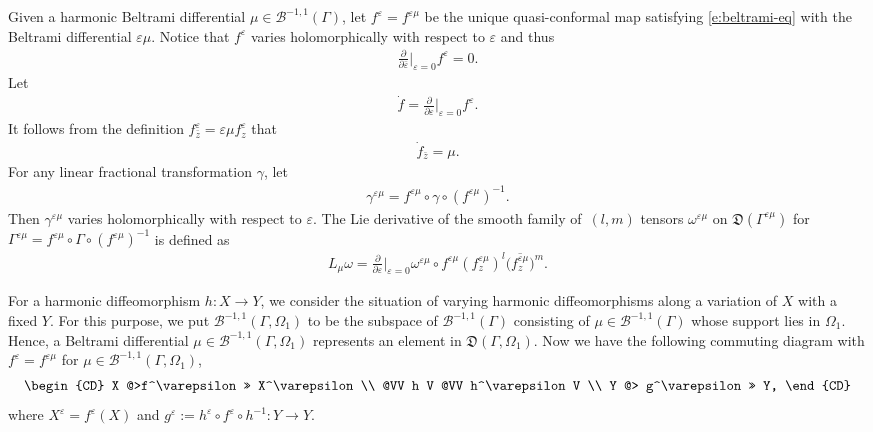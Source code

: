 \documentclass[pdftex]{sigma}%
\numberwithin{equation}{section}
\newcommand{\pa}{\partial}
\newcommand{\vep}{\varepsilon}
\begin{document}
Given a harmonic Beltrami differential $\mu\in \mathcal{B}^{-1,1}(\Gamma)$,
let $f^\vep=f^{\vep\mu}$ be the unique quasi-conformal map satisfying \eqref{e:beltrami-eq} with the Beltrami differential $\vep\mu$.
Notice that $f^{\vep}$ varies holomorphically with respect to $\vep$ and thus
\begin{gather*}
\frac{\pa}{\pa\bar{\vep}} \bigg|_{\vep=0}f^{\vep}=0.
\end{gather*}
Let
\begin{gather*}
\dot{f}= \frac{\pa}{\pa\vep}\bigg|_{\vep=0}f^{\vep}.
\end{gather*}
It follows from the definition $f^{\vep}_{\bar{z}}=\vep\mu f^{\vep}_z$ that
\begin{gather*}
\dot{f}_{\bar{z}}=\mu.
\end{gather*}
For any linear fractional transformation $\gamma$, let
\begin{gather*}
\gamma^{\vep\mu}=f^{\vep\mu}\circ\gamma\circ (f^{\vep\mu})^{-1}.
\end{gather*}
Then $\gamma^{\vep\mu}$ varies holomorphically with respect to $\vep$.
The Lie derivative of the smooth family of~$(l, m)$ tensors $\omega^{\vep\mu}$ on $\mathfrak{D}(\Gamma^{\vep\mu})$ for $\Gamma^{\vep\mu}= f^{\vep\mu}\circ\Gamma\circ (f^{\vep\mu})^{-1}$ is defined as
\begin{gather*}
L_{\mu}\omega=\frac{\pa}{\pa\vep}\bigg|_{\vep=0}\omega^{\vep\mu}\circ f^{\vep\mu} (f^{\vep\mu}_z)^l\big(\overline{f^{\vep\mu}_z}\big)^m.
\end{gather*}

For a harmonic diffeomorphism $h\colon X\to Y$, we consider the situation of varying harmonic diffeomorphisms along a variation of $X$ with a fixed $Y$.
For this purpose, we put $\mathcal{B}^{-1,1}(\Gamma,\Omega_1)$ to be the subspace of
$\mathcal{B}^{-1,1}(\Gamma)$ consisting of $\mu\in \mathcal{B}^{-1,1}(\Gamma)$ whose support lies in $\Omega_1$. Hence, a Beltrami differential $\mu\in\mathcal{B}^{-1,1}(\Gamma,\Omega_1)$ represents an element in $\mathfrak{D}(\Gamma,\Omega_1)$.
Now we have the following commuting diagram with $f^\vep=f^{\vep\mu}$ for $\mu\in\mathcal{B}^{-1,1}(\Gamma,\Omega_1)$,
\begin{gather*}%
\begin{CD}
 X @>f^\vep >> X^\vep \\
 @VV h V @VV h^\vep V \\
 Y @> g^\vep>> Y,
\end{CD}
\end{gather*}
where $X^\vep= f^\vep(X)$ and $g^\vep:= h^\vep\circ f^\vep\circ h^{-1}\colon Y\to Y$.
\end{document}
